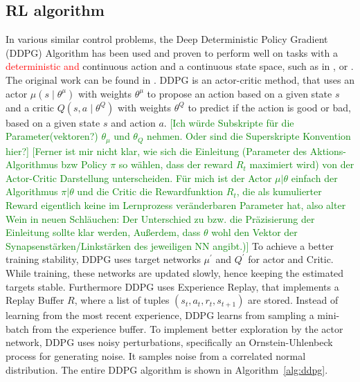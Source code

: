 \documentclass[review]{elsarticle}
\providecommand{\red}[1]{\textcolor{red}{#1}}
\providecommand{\green}[1]{\textcolor{green}{#1}}
\providecommand{\martin}[1]{\red{#1}} %
\providecommand{\martinc}[1]{\green{[#1]}} %
\providecommand{\3}{{\ss}}
\begin{document}
  \subsection{\label{RL-algorithm}RL algorithm}
  In various similar control problems, the Deep Deterministic Policy
  Gradient (DDPG) Algorithm has been used and proven to perform well on
  tasks with a \martin{deterministic and} continuous action and a
  continuous state space, such as in
  \cite{SafeEfficientAndComfortable}, \cite{ComparisonRLvsMPC} or
  \cite{HumanLikeAutonomouCF}. The original work can be found in
  \cite{DDPG}. DDPG is an actor-critic method, that uses an actor
  $\mu\left(s \mid \theta^{\mu}\right)$ with weights $\theta^{\mu} $
  to propose an action based on a given state $s$ and a critic
  $Q\left(s, a \mid \theta^{Q}\right) $ with weights  $\theta^{Q}$ to
  predict if the action is good or bad, based on a given state $s$ and
  action $a$. \martinc{Ich w\"urde Subskripte f\"ur die Parameter(vektoren?)
  $\theta_{\mu}$ und $\theta_Q$ nehmen. Oder sind die Superskripte
    Konvention hier?}
\martinc{Ferner ist mir nicht klar, wie sich die
    Einleitung (Parameter des Aktions-Algorithmus bzw  Policy $\pi$ so w\"ahlen, dass der reward $R_t$
    maximiert wird) von der
    Actor-Critic Darstellung unterscheiden. F\"ur mich ist der Actor
    $\mu|\theta$ einfach der Algorithmus $\pi|\theta$ und die Critic die
    Rewardfunktion $R_t$, die als kumulierter Reward eigentlich keine im Lernprozess
    ver\"anderbaren Parameter hat, also alter Wein in neuen
    Schl\"auchen: Der Unterschied zu bzw. die Pr\"azisierung der
    Einleitung sollte klar werden, Au\3erdem, dass $\theta$ wohl den
    Vektor der Synapsenst\"arken/Linkst\"arken des jeweiligen NN angibt.)} 
To achieve a better training stability, DDPG uses target networks  $\mu^{\prime}$ and $Q^{\prime}$ for actor and Critic. While training, these networks are updated slowly, hence keeping the estimated targets stable. Furthermore DDPG uses Experience Replay, that implements a Replay Buffer $R$, where a list of tuples $\left(s_{t}, a_{t}, r_{t}, s_{t+1}\right)$ are stored. Instead of learning from the most recent experience, DDPG learns from sampling a mini-batch from the experience buffer. To implement better exploration by the actor network, DDPG uses noisy perturbations, specifically an Ornstein-Uhlenbeck process for generating noise. It samples noise from a correlated normal distribution. The entire DDPG algorithm is shown in Algorithm~\ref{alg:ddpg}. 
  
\end{document}
